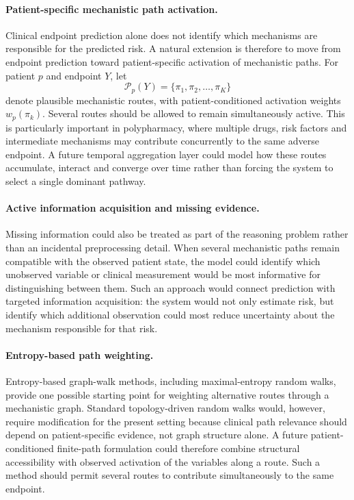 \paragraph{Patient-specific mechanistic path activation.}
Clinical endpoint prediction alone does not identify which mechanisms are responsible
for the predicted risk. A natural extension is therefore to move from endpoint prediction
toward patient-specific activation of mechanistic paths.
For patient $p$ and endpoint $Y$, let
\begin{equation}
\mathcal{P}_p(Y)=\{\pi_1,\pi_2,\ldots,\pi_K\}
\end{equation}
denote plausible mechanistic routes, with patient-conditioned activation weights
$w_p(\pi_k)$.
Several routes should be allowed to remain simultaneously active. This is particularly
important in polypharmacy, where multiple drugs, risk factors and intermediate mechanisms
may contribute concurrently to the same adverse endpoint.
A future temporal aggregation layer could model how these routes accumulate, interact
and converge over time rather than forcing the system to select a single dominant pathway.

\paragraph{Active information acquisition and missing evidence.}
Missing information could also be treated as part of the reasoning problem rather than an
incidental preprocessing detail. When several mechanistic paths remain compatible with the
observed patient state, the model could identify which unobserved variable or clinical
measurement would be most informative for distinguishing between them.
Such an approach would connect prediction with targeted information acquisition:
the system would not only estimate risk, but identify which additional observation could
most reduce uncertainty about the mechanism responsible for that risk.

\paragraph{Entropy-based path weighting.}
Entropy-based graph-walk methods, including maximal-entropy random walks, provide one
possible starting point for weighting alternative routes through a mechanistic graph.
Standard topology-driven random walks would, however, require modification for the
present setting because clinical path relevance should depend on patient-specific evidence,
not graph structure alone.
A future patient-conditioned finite-path formulation could therefore combine structural
accessibility with observed activation of the variables along a route. Such a method should
permit several routes to contribute simultaneously to the same endpoint.

